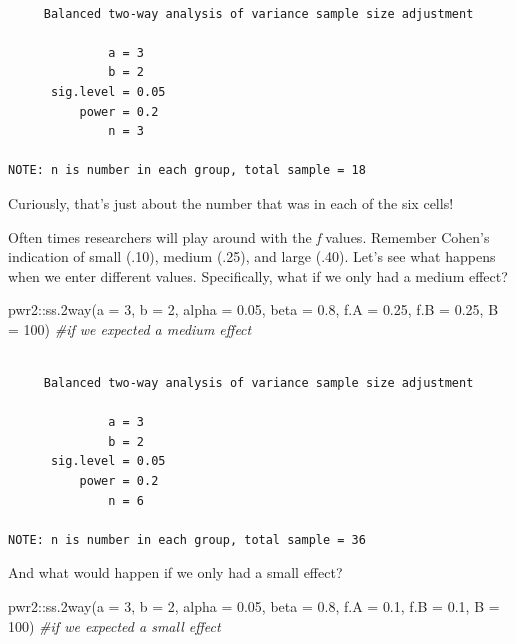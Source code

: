 \documentclass[
  11pt,
]{book}
\newenvironment{Shaded}{\begin{snugshade}}{\end{snugshade}}
\newcommand{\AttributeTok}[1]{\textcolor[rgb]{0.77,0.63,0.00}{#1}}
\newcommand{\CommentTok}[1]{\textcolor[rgb]{0.56,0.35,0.01}{\textit{#1}}}
\newcommand{\DecValTok}[1]{\textcolor[rgb]{0.00,0.00,0.81}{#1}}
\newcommand{\FloatTok}[1]{\textcolor[rgb]{0.00,0.00,0.81}{#1}}
\newcommand{\FunctionTok}[1]{\textcolor[rgb]{0.00,0.00,0.00}{#1}}
\newcommand{\NormalTok}[1]{#1}
\newcommand{\SpecialCharTok}[1]{\textcolor[rgb]{0.00,0.00,0.00}{#1}}
\begin{document}
\begin{verbatim}

     Balanced two-way analysis of variance sample size adjustment 

              a = 3
              b = 2
      sig.level = 0.05
          power = 0.2
              n = 3

NOTE: n is number in each group, total sample = 18
\end{verbatim}

Curiously, that's just about the number that was in each of the six cells!

Often times researchers will play around with the \emph{f} values. Remember Cohen's indication of small (.10), medium (.25), and large (.40). Let's see what happens when we enter different values. Specifically, what if we only had a medium effect?

\begin{Shaded}
\begin{Highlighting}[]
\NormalTok{pwr2}\SpecialCharTok{::}\FunctionTok{ss.2way}\NormalTok{(}\AttributeTok{a =} \DecValTok{3}\NormalTok{, }\AttributeTok{b =} \DecValTok{2}\NormalTok{, }\AttributeTok{alpha =} \FloatTok{0.05}\NormalTok{, }\AttributeTok{beta =} \FloatTok{0.8}\NormalTok{, }\AttributeTok{f.A =} \FloatTok{0.25}\NormalTok{, }\AttributeTok{f.B =} \FloatTok{0.25}\NormalTok{,}
    \AttributeTok{B =} \DecValTok{100}\NormalTok{)  }\CommentTok{\#if we expected a medium effect}
\end{Highlighting}
\end{Shaded}

\begin{verbatim}

     Balanced two-way analysis of variance sample size adjustment 

              a = 3
              b = 2
      sig.level = 0.05
          power = 0.2
              n = 6

NOTE: n is number in each group, total sample = 36
\end{verbatim}

And what would happen if we only had a small effect?

\begin{Shaded}
\begin{Highlighting}[]
\NormalTok{pwr2}\SpecialCharTok{::}\FunctionTok{ss.2way}\NormalTok{(}\AttributeTok{a =} \DecValTok{3}\NormalTok{, }\AttributeTok{b =} \DecValTok{2}\NormalTok{, }\AttributeTok{alpha =} \FloatTok{0.05}\NormalTok{, }\AttributeTok{beta =} \FloatTok{0.8}\NormalTok{, }\AttributeTok{f.A =} \FloatTok{0.1}\NormalTok{, }\AttributeTok{f.B =} \FloatTok{0.1}\NormalTok{,}
    \AttributeTok{B =} \DecValTok{100}\NormalTok{)  }\CommentTok{\#if we expected a small effect}
\end{Highlighting}
\end{Shaded}
\end{document}
